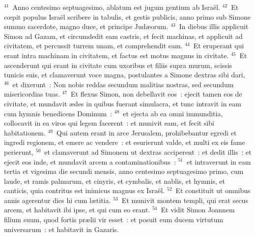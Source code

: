 ${}^{41}$~Anno centesimo septuagesimo, ablatum est jugum gentium ab Isra\"el.
${}^{42}$~Et cœpit populus Isra\"el scribere in tabulis, et gestis publicis, anno primo sub Simone summo sacerdote, magno duce, et principe Jud\ae orum.
${}^{43}$~In diebus illis applicuit Simon ad Gazam, et circumdedit eam castris, et fecit machinas, et applicuit ad civitatem, et percussit turrem unam, et comprehendit eam.
${}^{44}$~Et eruperant qui erant intra machinam in civitatem, et factus est motus magnus in civitate.
${}^{45}$~Et ascenderunt qui erant in civitate cum uxoribus et filiis supra murum, scissis tunicis suis, et clamaverunt voce magna, postulantes a Simone dextras sibi dari,
${}^{46}$~et dixerunt~: Non nobis reddas secundum malitias nostras, sed secundum misericordias tuas.
${}^{47}$~Et flexus Simon, non debellavit eos~: ejecit tamen eos de civitate, et mundavit \ae des in quibus fuerant simulacra, et tunc intravit in eam cum hymnis benedicens Dominum~:
${}^{48}$~et ejecta ab ea omni immunditia, collocavit in ea viros qui legem facerent~: et munivit eam, et fecit sibi habitationem.
${}^{49}$~Qui autem erant in arce Jerusalem, prohibebantur egredi et ingredi regionem, et emere ac vendere~: et esurierunt valde, et multi ex eis fame perierunt,
${}^{50}$~et clamaverunt ad Simonem ut dextras acciperent~: et dedit illis~: et ejecit eos inde, et mundavit arcem a contaminationibus~:
${}^{51}$~et intraverunt in eam tertia et vigesima die secundi mensis, anno centesimo septuagesimo primo, cum laude, et ramis palmarum, et cinyris, et cymbalis, et nablis, et hymnis, et canticis, quia contritus est inimicus magnus ex Isra\"el.
${}^{52}$~Et constituit ut omnibus annis agerentur dies hi cum l\ae titia.
${}^{53}$~Et munivit montem templi, qui erat secus arcem, et habitavit ibi ipse, et qui cum eo erant.
${}^{54}$~Et vidit Simon Joannem filium suum, quod fortis pr\ae lii vir esset~: et posuit eum ducem virtutum universarum~: et habitavit in Gazaris.

